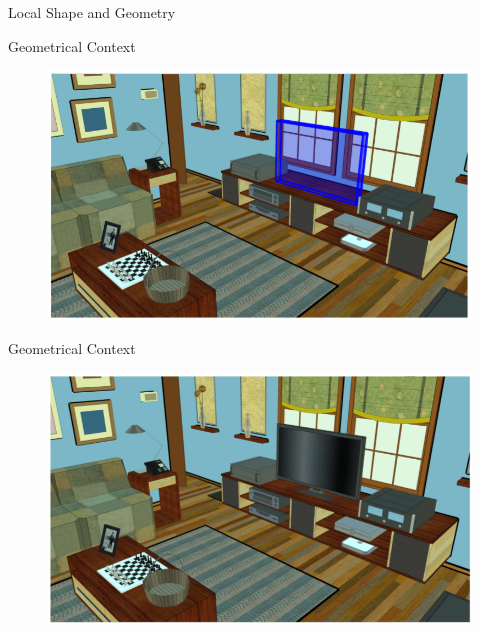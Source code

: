 \documentclass{beamer}
\begin{document}
\begin{frame}{Local Shape and Geometry}
\end{frame}

\begin{frame}{Geometrical Context}
\begin{figure}[t!]
\includegraphics[width=.8\linewidth]{contextHole.png}
\end{figure}
\end{frame}


\begin{frame}{Geometrical Context}
\begin{figure}[t!]
\includegraphics[width=.8\linewidth]{contextHoleFilled.png}
\end{figure}
\end{frame}
\end{document}
